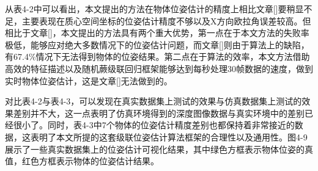 从表4-2中可以看出，本文提出的方法在物体位姿估计的精度上相比文章[]要稍显不足，主要表现在质心空间坐标的位姿估计精度不够以及X方向欧拉角误差较高。但相比于文章[]，本文提出的方法具有两个重大优势，第一点在于本文方法的失败率极低，能够应对绝大多数情况下的位姿估计问题，而文章[]则由于算法上的缺陷，有67.4\%情况下无法得到物体的位姿结果。第二点在于算法的效率，本文方法借助高效的特征描述以及随机蕨级联回归框架能够达到每秒处理30帧数据的速度，做到实时物体位姿估计，这是文章[]无法做到的。

对比表4-2与表4-3，可以发现在真实数据集上测试的效果与仿真数据集上测试的效果差别并不大，这一点表明了仿真环境得到的深度图像数据与真实环境中的差别已经很小了。同时，表4-3中7个物体的位姿估计精度差别也都保持着非常接近的数据，这表明了本文所提的这套级联位姿估计算法框架的合理性以及通用性。图4-9展示了一些真实数据集上的位姿估计可视化结果，其中绿色方框表示物体位姿的真值，红色方框表示物体的位姿估计结果。

